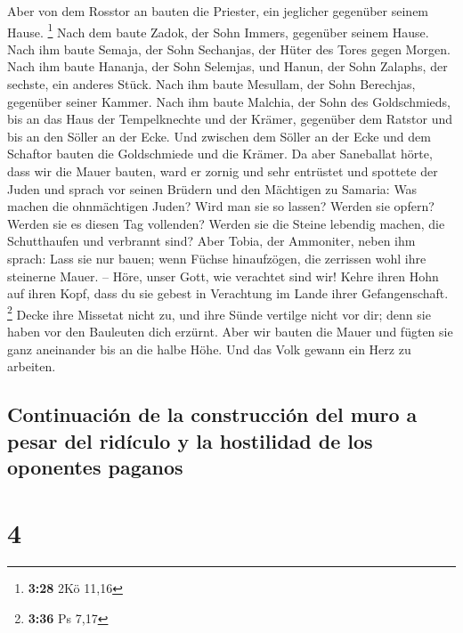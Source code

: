  Aber von dem Rosstor an bauten die Priester, ein
jeglicher gegenüber seinem Hause. \footnote{\textbf{3:28} 2Kö 11,16}
 Nach dem baute Zadok, der Sohn Immers, gegenüber seinem
Hause. Nach ihm baute Semaja, der Sohn Sechanjas, der Hüter des Tores
gegen Morgen.  Nach ihm baute Hananja, der Sohn Selemjas,
und Hanun, der Sohn Zalaphs, der sechste, ein anderes Stück. Nach ihm
baute Mesullam, der Sohn Berechjas, gegenüber seiner Kammer.
 Nach ihm baute Malchia, der Sohn des Goldschmieds, bis
an das Haus der Tempelknechte und der Krämer, gegenüber dem Ratstor und
bis an den Söller an der Ecke.  Und zwischen dem Söller
an der Ecke und dem Schaftor bauten die Goldschmiede und die Krämer.
 Da aber Saneballat hörte, dass wir die Mauer bauten,
ward er zornig und sehr entrüstet und spottete der Juden 
und sprach vor seinen Brüdern und den Mächtigen zu Samaria: Was machen
die ohnmächtigen Juden? Wird man sie so lassen? Werden sie opfern?
Werden sie es diesen Tag vollenden? Werden sie die Steine lebendig
machen, die Schutthaufen und verbrannt sind?  Aber Tobia,
der Ammoniter, neben ihm sprach: Lass sie nur bauen; wenn Füchse
hinaufzögen, die zerrissen wohl ihre steinerne Mauer. -- 
Höre, unser Gott, wie verachtet sind wir! Kehre ihren Hohn auf ihren
Kopf, dass du sie gebest in Verachtung im Lande ihrer Gefangenschaft.
\footnote{\textbf{3:36} Ps 7,17}  Decke ihre Missetat
nicht zu, und ihre Sünde vertilge nicht vor dir; denn sie haben vor den
Bauleuten dich erzürnt.  Aber wir bauten die Mauer und
fügten sie ganz aneinander bis an die halbe Höhe. Und das Volk gewann
ein Herz zu arbeiten.

\hypertarget{continuaciuxf3n-de-la-construcciuxf3n-del-muro-a-pesar-del-riduxedculo-y-la-hostilidad-de-los-oponentes-paganos}{%
\subsection{Continuación de la construcción del muro a pesar del
ridículo y la hostilidad de los oponentes
paganos}\label{continuaciuxf3n-de-la-construcciuxf3n-del-muro-a-pesar-del-riduxedculo-y-la-hostilidad-de-los-oponentes-paganos}}

\hypertarget{section-3}{%
\section{4}\label{section-3}}

